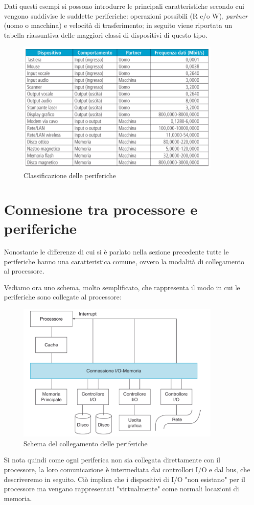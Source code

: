 \documentclass[class=book, crop=false, oneside]{standalone}
\begin{document}
Dati questi esempi si possono introdurre le principali caratteristiche secondo cui vengono suddivise le suddette periferiche: operazioni possibili (R e/o W), \emph{partner} (uomo o macchina) e velocità di trasferimento; in seguito viene riportata un tabella riassuntiva delle maggiori classi di dispositivi di questo tipo.

\begin{figure}[H]
	\centering
	\includegraphics[width=0.9\textwidth,keepaspectratio]{classificazione-periferiche}
	\caption{Classificazione delle periferiche}
\end{figure}

\section{Connesione tra processore e periferiche}
Nonostante le differenze di cui si è parlato nella sezione precedente tutte le periferiche hanno una caratteristica comune, ovvero la modalità di collegamento al processore.

Vediamo ora uno schema, molto semplificato, che rappresenta il modo in cui le periferiche sono collegate al processore:
\begin{figure}
	\centering
	\includegraphics[width=0.9\textwidth,keepaspectratio]{schema-periferiche}
	\caption{Schema del collegamento delle periferiche}
\end{figure}
Si nota quindi come ogni periferica non sia collegata direttamente con il processore, la loro comunicazione è intermediata dai controllori I/O e dal bus, che descriveremo in seguito.
Ciò implica che i dispositivi di I/O "non esistano" per il processore ma vengano rappresentati "virtualmente" come normali locazioni di memoria.
\end{document}
